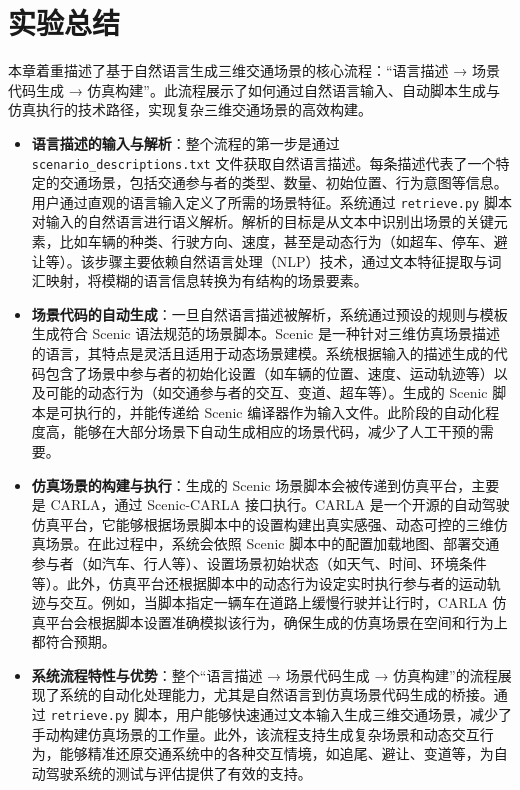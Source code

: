 \section{实验总结}

本章着重描述了基于自然语言生成三维交通场景的核心流程：“语言描述 → 场景代码生成 → 仿真构建”。此流程展示了如何通过自然语言输入、自动脚本生成与仿真执行的技术路径，实现复杂三维交通场景的高效构建。

\begin{itemize}
	\item \textbf{语言描述的输入与解析}：整个流程的第一步是通过 \texttt{scenario\_descriptions.txt} 文件获取自然语言描述。每条描述代表了一个特定的交通场景，包括交通参与者的类型、数量、初始位置、行为意图等信息。用户通过直观的语言输入定义了所需的场景特征。系统通过 \texttt{retrieve.py} 脚本对输入的自然语言进行语义解析。解析的目标是从文本中识别出场景的关键元素，比如车辆的种类、行驶方向、速度，甚至是动态行为（如超车、停车、避让等）。该步骤主要依赖自然语言处理（NLP）技术，通过文本特征提取与词汇映射，将模糊的语言信息转换为有结构的场景要素。
	
	\item \textbf{场景代码的自动生成}：一旦自然语言描述被解析，系统通过预设的规则与模板生成符合 Scenic 语法规范的场景脚本。Scenic 是一种针对三维仿真场景描述的语言，其特点是灵活且适用于动态场景建模。系统根据输入的描述生成的代码包含了场景中参与者的初始化设置（如车辆的位置、速度、运动轨迹等）以及可能的动态行为（如交通参与者的交互、变道、超车等）。生成的 Scenic 脚本是可执行的，并能传递给 Scenic 编译器作为输入文件。此阶段的自动化程度高，能够在大部分场景下自动生成相应的场景代码，减少了人工干预的需要。
	
	\item \textbf{仿真场景的构建与执行}：生成的 Scenic 场景脚本会被传递到仿真平台，主要是 CARLA，通过 Scenic-CARLA 接口执行。CARLA 是一个开源的自动驾驶仿真平台，它能够根据场景脚本中的设置构建出真实感强、动态可控的三维仿真场景。在此过程中，系统会依照 Scenic 脚本中的配置加载地图、部署交通参与者（如汽车、行人等）、设置场景初始状态（如天气、时间、环境条件等）。此外，仿真平台还根据脚本中的动态行为设定实时执行参与者的运动轨迹与交互。例如，当脚本指定一辆车在道路上缓慢行驶并让行时，CARLA 仿真平台会根据脚本设置准确模拟该行为，确保生成的仿真场景在空间和行为上都符合预期。
	
	\item \textbf{系统流程特性与优势}：整个“语言描述 → 场景代码生成 → 仿真构建”的流程展现了系统的自动化处理能力，尤其是自然语言到仿真场景代码生成的桥接。通过 \texttt{retrieve.py} 脚本，用户能够快速通过文本输入生成三维交通场景，减少了手动构建仿真场景的工作量。此外，该流程支持生成复杂场景和动态交互行为，能够精准还原交通系统中的各种交互情境，如追尾、避让、变道等，为自动驾驶系统的测试与评估提供了有效的支持。
	
\end{itemize}
